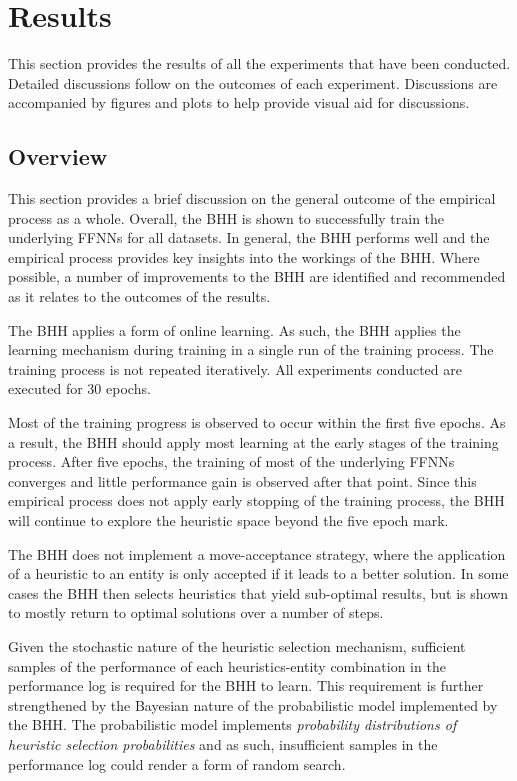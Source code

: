 \section{Results}
\label{sec:results}

This section provides the results of all the experiments that have been conducted. Detailed discussions follow on the outcomes of each experiment. Discussions are accompanied by figures and plots to help provide visual aid for discussions.

\subsection{Overview}\label{sec:results:overview}

This section provides a brief discussion on the general outcome of the empirical process as a whole. Overall, the \acs{BHH} is shown to successfully train the underlying \acp{FFNN} for all datasets. In general, the \acs{BHH} performs well and the empirical process provides key insights into the workings of the \acs{BHH}. Where possible, a number of improvements to the \acs{BHH} are identified and recommended as it relates to the outcomes of the results.

The \acs{BHH} applies a form of online learning. As such, the \acs{BHH} applies the learning mechanism during training in a single run of the training process. The training process is not repeated iteratively. All experiments conducted are executed for 30 epochs.

Most of the training progress is observed to occur within the first five epochs. As a result, the \acs{BHH} should apply most learning at the early stages of the training process. After five epochs, the training of most of the underlying \acp{FFNN} converges and little performance gain is observed after that point. Since this empirical process does not apply early stopping of the training process, the \acs{BHH} will continue to explore the heuristic space beyond the five epoch mark.

The \acs{BHH} does not implement a move-acceptance strategy, where the application of a heuristic to an entity is only accepted if it leads to a better solution. In some cases the \acs{BHH} then selects heuristics that yield sub-optimal results, but is shown to mostly return to optimal solutions over a number of steps.

Given the stochastic nature of the heuristic selection mechanism, sufficient samples of the performance of each heuristics-entity combination in the performance log is required for the \acs{BHH} to learn. This requirement is further strengthened by the Bayesian nature of the probabilistic model implemented by the \acs{BHH}. The probabilistic model implements \textit{probability distributions of heuristic selection probabilities} and as such, insufficient samples in the performance log could render a form of random search.

